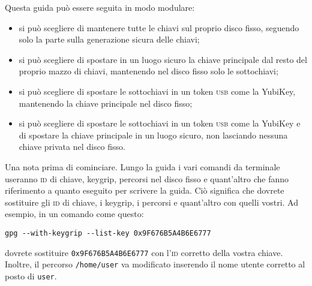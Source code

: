 Questa guida può essere seguita in modo modulare:

\begin{itemize}
  \item si può scegliere di mantenere tutte le chiavi sul proprio disco fisso,
  seguendo solo la parte sulla generazione sicura delle chiavi;
  \item si può scegliere di spostare in un luogo sicuro la chiave principale dal
  resto del proprio mazzo di chiavi, mantenendo nel disco fisso solo le
  sottochiavi;
  \item si può scegliere di spostare le sottochiavi in un token \textsc{usb}
  come la YubiKey, mantenendo la chiave principale nel disco fisso;
  \item si può scegliere di spostare le sottochiavi in un token \textsc{usb}
  come la YubiKey e di spostare la chiave principale in un luogo sicuro, non
  lasciando nessuna chiave privata nel disco fisso.
\end{itemize}

Una nota prima di cominciare. Lungo la guida i vari comandi da
terminale useranno \textsc{id} di chiave, keygrip, percorsi nel disco fisso e
quant'altro che fanno riferimento a quanto eseguito per scrivere la guida. Ciò
significa che dovrete sostituire gli \textsc{id} di chiave, i keygrip, i
percorsi e quant'altro con quelli vostri. Ad esempio, in un comando come questo:

\begin{lstlisting}
gpg --with-keygrip --list-key 0x9F676B5A4B6E6777
\end{lstlisting}

dovrete sostituire \texttt{0x9F676B5A4B6E6777} con l'\textsc{id} corretto della
vostra chiave. Inoltre, il percorso \texttt{/home/user} va modificato inserendo
il nome utente corretto al posto di \texttt{user}.
